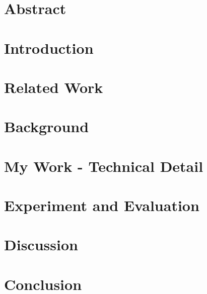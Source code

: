 \documentclass[a4paper,12pt]{article}
\begin{document}
\section*{Abstract}







\section{Introduction}


\clearpage

\section{Related Work}

\clearpage

\section{Background}



\clearpage

\section{My Work - Technical Detail}




\clearpage

\section{Experiment and Evaluation}





\clearpage

\section{Discussion}

\clearpage

\section{Conclusion}

\clearpage



\end{document}
